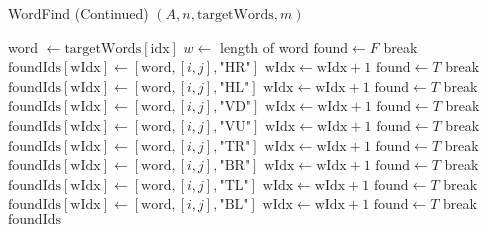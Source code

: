 \documentclass[12pt letter]{report}
\begin{document}
\begin{algorithm}[H]
  \caption{WordFind (Continued) $ \left( A, n, \text{targetWords}, m \right) $}
  \begin{algorithmic}[1]
    \State word $ \gets \text{targetWords}[\text{idx}]$
    \State $w \gets$ length of word
    \State $\text{found} \gets F$
      
    \State break
    \EndIf
    \State $\text{foundIds}[\text{wIdx}] \gets [ \text{word}, [i,j], \text{"HR"}]$
    \State $\text{wIdx} \gets \text{wIdx} + 1$
    \State $\text{found} \gets T$
    \State break
    \State $\text{foundIds}[\text{wIdx}] \gets [\text{word},[i,j], \text{"HL"}]$
    \State $\text{wIdx} \gets \text{wIdx} + 1$
    \State $\text{found} \gets T$
    \State break
    \State $\text{foundIds}[\text{wIdx}] \gets [\text{word},[i,j], \text{"VD"}]$
    \State $\text{wIdx} \gets \text{wIdx} + 1$
    \State $\text{found} \gets T$
    \State break
    \State $\text{foundIds}[\text{wIdx}] \gets [\text{word},[i,j], \text{"VU"}]$
    \State $\text{wIdx} \gets \text{wIdx} + 1$
    \State $\text{found} \gets T$
    \State break
    \State $\text{foundIds}[\text{wIdx}] \gets [\text{word},[i,j], \text{"TR"}]$
    \State $\text{wIdx} \gets \text{wIdx} + 1$
    \State $\text{found} \gets T$
    \State break
    \State $\text{foundIds}[\text{wIdx}] \gets [\text{word},[i,j], \text{"BR"}]$
    \State $\text{wIdx} \gets \text{wIdx} + 1$
    \State $\text{found} \gets T$
    \State break
    \State $\text{foundIds}[\text{wIdx}] \gets [\text{word},[i,j], \text{"TL"}]$
    \State $\text{wIdx} \gets \text{wIdx} + 1$
    \State $\text{found} \gets T$
    \State break
    \State $\text{foundIds}[\text{wIdx}] \gets [\text{word},[i,j], \text{"BL"}]$
    \State $\text{wIdx} \gets \text{wIdx} + 1$
    \State $\text{found} \gets T$
    \State break
    \EndIf
    \EndFor
    \EndFor
    \EndFor \\
    \State \Return $\text{foundIds}$
  \end{algorithmic}
\end{algorithm}
\end{document}
